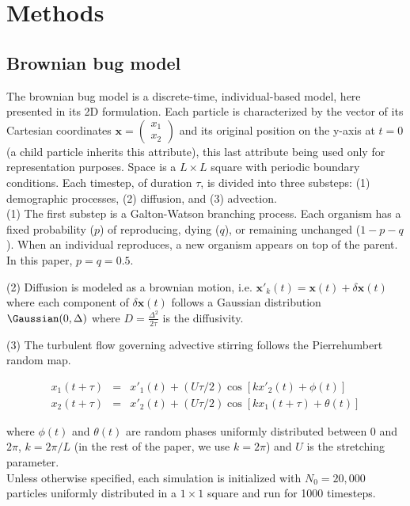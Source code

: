 \section*{Methods}

\subsection*{Brownian bug model}
The brownian bug model is a discrete-time, individual-based model, here presented in its 2D formulation. Each particle is characterized by the vector of its Cartesian coordinates $\boldsymbol{x}=\begin{pmatrix} 
      x_1\\ 
      x_2 
\end{pmatrix}$ and its original position on the y-axis at $t=0$ (a child particle inherits this attribute), this last attribute being used only for representation purposes. Space is a $L\times L$ square with periodic boundary conditions. Each timestep, of duration $\tau$, is divided into three substeps: (1) demographic processes, (2) diffusion, and (3) advection. \\

(1) The first substep is a Galton-Watson branching process. Each organism has a fixed probability ($p$) of reproducing, dying ($q$), or remaining unchanged ($1-p-q$). When an individual reproduces, a new organism appears on top of the parent. In this paper, $p=q=0.5$.

(2) Diffusion is modeled as a brownian motion, i.e. $\boldsymbol{x'}_k(t)=\boldsymbol{x}(t)+\delta\boldsymbol{x}(t)$ where each component of $\delta\boldsymbol{x}(t)$ follows a Gaussian distribution $\Gaussian (0,\Delta)$ where $D=\frac{\Delta^2}{2\tau}$ is the diffusivity. 

(3) The turbulent flow governing advective stirring follows the Pierrehumbert random map.

\begin{eqnarray}
 x_1(t+\tau)&=&x'_1(t)+(U\tau/2)\cos[kx'_2(t)+\phi(t)]\\
 x_2(t+\tau)&=&x'_2(t)+(U\tau/2)\cos[kx_1(t+\tau)+\theta(t)]
 \label{eq:pierrehumbert}
 \end{eqnarray}

 where $\phi(t)$ and $\theta(t)$ are random phases uniformly distributed between 0 and $2\pi$, $k=2\pi/L$ (in the rest of the paper, we use $k=2\pi$) and $U$ is the stretching parameter. \\
 
Unless otherwise specified, each simulation is initialized with $N_0=20,000$ particles uniformly distributed in a $1\times 1$ square and run for 1000 timesteps.
 
